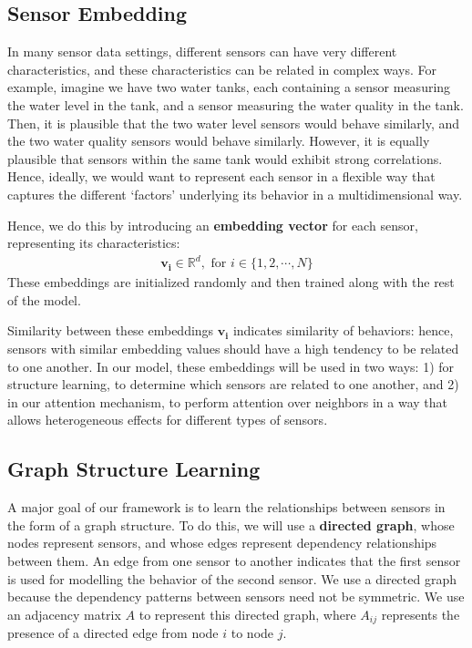 \documentclass[letterpaper]{article} %
\begin{document}
\subsection{Sensor Embedding}
In many sensor data settings, different sensors can have very different characteristics, and these characteristics can be related in complex ways. For example, imagine we have two water tanks, each containing a sensor measuring the water level in the tank, and a sensor measuring the water quality in the tank. Then, it is plausible that the two water level sensors would behave similarly, and the two water quality sensors would behave similarly. However, it is equally plausible that sensors within the same tank would exhibit strong correlations. Hence, ideally, we would want to represent each sensor in a flexible way that captures the different `factors' underlying its behavior in a multidimensional way. 

Hence, we do this by introducing an \textbf{embedding vector} for each sensor, representing its characteristics: 
\begin{align*}
    \mathbf{v_i} \in \mathbb{R}^d,\text{ for }i \in \{1, 2, \cdots, N\}
\end{align*}
These embeddings are initialized randomly and then trained along with the rest of the model.

Similarity between these embeddings $\mathbf{v_i}$ indicates similarity of behaviors: hence, sensors with similar embedding values should have a high tendency to be related to one another. In our model, these embeddings will be used in two ways: 1) for structure learning, to determine which sensors are related to one another, and 2) in our attention mechanism, to perform attention over neighbors in a way that allows heterogeneous effects for different types of sensors.  

\subsection{Graph Structure Learning}

A major goal of our framework is to learn the relationships between sensors in the form of a graph structure. To do this, we will use a \textbf{directed graph}, whose nodes represent sensors, and whose edges represent dependency relationships between them. An edge from one sensor to another indicates that the first sensor is used for modelling the behavior of the second sensor. We use a directed graph because the dependency patterns between sensors need not be symmetric. We use an adjacency matrix $A$ to represent this directed graph, where $A_{ij}$ represents the presence of a directed edge from node $i$ to node $j$.
\end{document}
